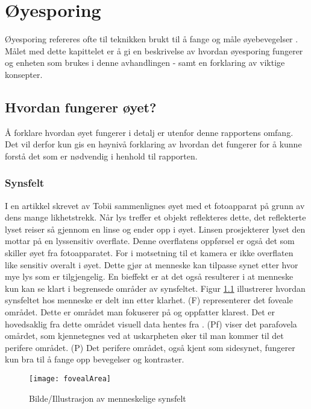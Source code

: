
\chapter{Øyesporing}

Øyesporing refereres ofte til teknikken brukt til å fange og måle øyebevegelser \cite{Calibration}. Målet med dette kapittelet er å gi en beskrivelse av hvordan øyesporing fungerer og enheten som brukes i denne avhandlingen - samt en forklaring av viktige konsepter.


\section{Hvordan fungerer øyet?}

Å forklare hvordan øyet fungerer i detalj er utenfor denne rapportens omfang. Det vil derfor kun gis en høynivå forklaring av hvordan det fungerer for å kunne forstå det som er nødvendig i henhold til rapporten. 

\subsection{Synsfelt}

I en artikkel skrevet av Tobii \cite{Calibration} sammenlignes øyet med et fotoapparat på grunn av dens mange likhetstrekk. Når lys treffer et objekt reflekteres dette, det reflekterte lyset reiser så gjennom en linse og ender opp i øyet. Linsen prosjekterer lyset den mottar på en lyssensitiv overflate. Denne overflatens oppførsel er også det som skiller øyet fra fotoapparatet. For i motsetning til et kamera er ikke overflaten like sensitiv overalt i øyet.  Dette gjør at menneske kan tilpasse synet etter hvor mye lys som er tilgjengelig. En bieffekt er at det også resulterer i at menneske kun kan se klart i begrensede områder av synsfeltet. Figur \ref{fig:visueltArea} illustrerer hvordan synsfeltet hos menneske er delt inn etter klarhet. (F) representerer det foveale området. Dette er området man fokuserer på og oppfatter klarest. Det er hovedsaklig fra dette området visuell data hentes fra . (Pf) viser det parafovela omårdet, som kjennetegnes ved at uskarpheten øker til man kommer til det perifere området. (P) Det perifere området, også kjent som sidesynet, fungerer kun bra til å fange opp bevegelser og kontraster.

\begin{figure}[ht!]
\centering
\texttt{[image: fovealArea]}
\caption{Bilde/Illustrasjon av menneskelige synsfelt \cite{VisualImage}}
\label{fig:visueltArea}
\end{figure}

